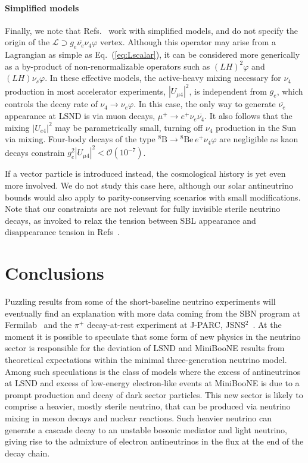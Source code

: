 \documentclass[
reprint,
superscriptaddress,
showpacs,
preprintnumbers,
nofootinbib,
nobibnotes,
amsmath,
amssymb, 
aps,
prd,
floatfix
]{revtex4-1}
\newcommand{\refeq}[1]{Eq.~(\ref{#1})}
\renewcommand{\phi}{\varphi}
\begin{document}
\paragraph{Simplified models} Finally, we note that Refs.~\cite{PalomaresRuiz:2005vf,deGouvea:2019qre} work with simplified models, and do not specify the origin of the $ \mathcal{L}\supset g_e \overline{\nu_e} \nu_4 \phi$ vertex. Although this operator may arise from a Lagrangian as simple as \refeq{eq:Lscalar}, it can be considered more generically as a by-product of non-renormalizable operators such as $(LH)^2 \phi$ and $(LH)\nu_s\phi$. In these effective models, the active-heavy mixing necessary for $\nu_4$ production in most accelerator experiments, $|U_{\mu4}|^2$, is independent from $g_e$, which controls the decay rate of $\nu_4\to\nu_e\phi$. In this case, the only way to generate $\overline{\nu_e}$ appearance at LSND is via muon decays, $\mu^+\to e^+\nu_e\overline{\nu_4}$. It also follows that the mixing $|U_{e4}|^2$ may be parametrically small, turning off $\nu_4$ production in the Sun via mixing. Four-body decays of the type $^8\text{B}\to {^8}\text{Be} \,e^+ \nu_4 \phi$ are negligible as kaon decays constrain $g_e^2 |U_{\mu 4}|^2 < \mathcal{O}(10^{-7})$.


If a vector particle is introduced instead, the cosmological history is yet even more involved. We do not study this case here, although our solar antineutrino bounds would also apply to parity-conserving scenarios with small modifications. Note that our constraints are not relevant for fully invisible sterile neutrino decays, as invoked to relax the tension between SBL appearance and disappearance tension in Refs~\cite{Diaz:2019fwt,Moulai:2019gpi}.

\section{Conclusions}\label{sec:conclusions}

Puzzling results from some of the short-baseline neutrino experiments will eventually find an explanation with more data coming from the SBN program at Fermilab~\cite{Cianci:2017okw,Antonello:2015lea,Machado:2019oxb} and the $\pi^+$ decay-at-rest experiment at J-PARC, JSNS$^2$~\cite{Ajimura:2017fld}. At the moment it is possible to speculate that some form of new physics in the neutrino sector is responsible for the deviation of LSND and MiniBooNE results from theoretical expectations within the minimal three-generation neutrino model. Among such speculations is the class of models where the excess of antineutrinos at LSND and excess of low-energy electron-like events at MiniBooNE is due to a prompt production and decay of dark sector particles. This new sector is likely to comprise a heavier, mostly sterile neutrino, that can be produced via neutrino mixing in meson decays and nuclear reactions. Such heavier neutrino can generate a cascade decay to an unstable bosonic mediator and light neutrino, giving rise to the admixture of electron antineutrinos in the flux at the end of the decay chain. 
\end{document}
